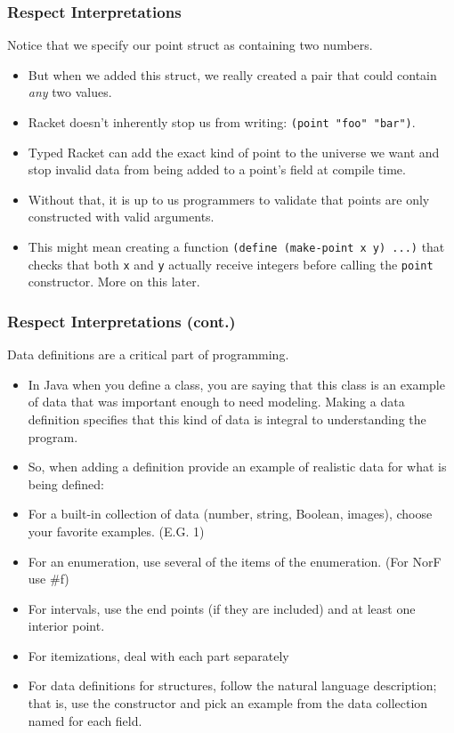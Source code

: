 \documentclass{beamer}
\begin{document}
\begin{frame}
  \frametitle{Respect Interpretations}
  Notice that we specify our point struct as containing
  two numbers.
  \begin{itemize}
  \item<2-> But when we added this struct, we really created a pair
    that could contain \emph{any} two values.
  \item<3-> Racket doesn't inherently stop us from writing:
    \texttt{(point "foo" "bar")}.
  \item<4-> Typed Racket can add the exact kind of point to the universe we want and stop invalid data from being added to a point's
    field at compile time.
  \item<5-> Without that, it is up to us programmers to validate
    that points are only constructed with valid arguments.
  \item<6-> This might mean creating a function \texttt{(define (make-point x y) ...)} that checks
    that both \texttt{x} and \texttt{y} actually receive integers before calling the \texttt{point} constructor. More on this later.
  \end{itemize}
\end{frame}

\begin{frame}
  \frametitle{Respect Interpretations (cont.)}
  Data definitions are a critical part of programming.
  \begin{itemize}
  \item<2-> In Java
  when you define a class, you are saying that this class is an example
  of data that was important enough to need modeling. Making a data definition specifies that this kind of data is integral to understanding the program.
\item<4-> So, when adding a definition provide an example of realistic
  data for what is being defined:
\item<5-> For a built-in collection of data (number, string, Boolean, images), choose your favorite examples. (E.G. 1)
\item<6-> For an enumeration, use several of the items of the enumeration. (For NorF use \#f)
\item<7-> For intervals, use the end points (if they are included) and at least one interior point.
\item<8-> For itemizations, deal with each part separately
\item<9-> For data definitions for structures, follow the natural language description; that is, use the constructor and pick an example from the data collection named for each field.
  \end{itemize}
\end{frame}
\end{document}
